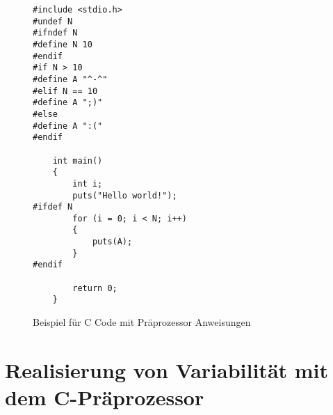
\lstset{escapechar=@,style=customc}
\begin{figure}[H]
\hspace*{3cm}
\begin{minipage}{\textwidth}
\begin{lstlisting}
#include <stdio.h>
#undef N
#ifndef N
#define N 10
#endif	
#if N > 10
#define A "^-^"
#elif N == 10
#define A ";)"
#else
#define A ":("
#endif
	
	int main()
	{
		int i;
		puts("Hello world!");
#ifdef N
		for (i = 0; i < N; i++)
		{
			puts(A);
		}
#endif
		
		return 0;
	}
\end{lstlisting}
\end{minipage}
%
\caption{Beispiel für C Code mit Präprozessor Anweisungen}
\end{figure}


\section{Realisierung von Variabilität mit dem C-Präprozessor}

